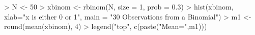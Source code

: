 \begin{Schunk}
\begin{Sinput}
> N <- 50
> xbinom <- rbinom(N, size = 1, prob = 0.3)
> hist(xbinom, xlab="x is either 0 or 1", main = "30 Observations from a Binomial")
> m1 <- round(mean(xbinom), 4)
> legend("top", c(paste("Mean=",m1)))
\end{Sinput}
\end{Schunk}
